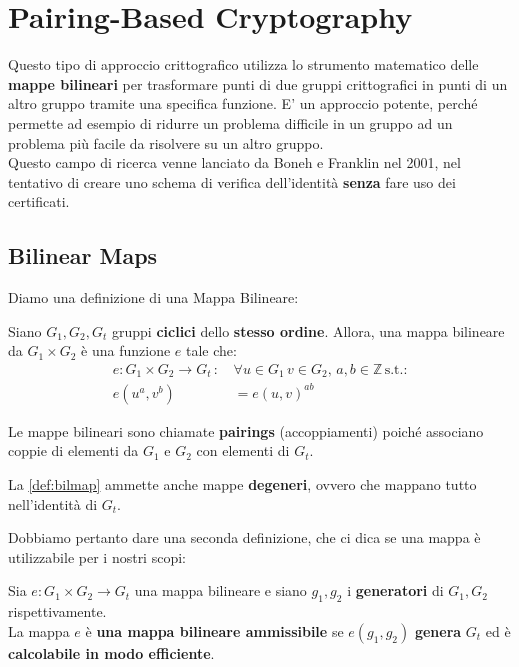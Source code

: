 \chapter{Pairing-Based Cryptography}
Questo tipo di approccio crittografico utilizza lo strumento matematico delle \textbf{mappe bilineari} per trasformare punti di due gruppi crittografici in punti di un altro gruppo tramite una specifica funzione. E' un approccio potente, perché permette ad esempio di ridurre un problema difficile in un gruppo ad un problema più facile da risolvere su un altro gruppo.\\
Questo campo di ricerca venne lanciato da Boneh e Franklin nel 2001, nel tentativo di creare uno schema di verifica dell'identità \textbf{senza} fare uso dei certificati.
\section{Bilinear Maps}
Diamo una definizione di una Mappa Bilineare:
\begin{definition}\label{def:bilmap}
Siano $G_1,G_2,G_t$ gruppi \textbf{ciclici} dello \textbf{stesso ordine}. Allora, una mappa bilineare da $G_1\times G_2$ è una funzione $e$ tale che:
\begin{equation}
    \begin{aligned}
    e:G_1\times G_2\longrightarrow G_t\,:\, &\forall u\in{G_1}\, v\in{G_2},\,a,b\in{\mathbb{Z}}\,\text{s.t.:}\\
    e(u^a,v^b)&=e(u,v)^{ab}
    \end{aligned}
\end{equation}
\end{definition}
\begin{remark}
Le mappe bilineari sono chiamate \textbf{pairings} (accoppiamenti) poiché associano coppie di elementi da $G_1$ e $G_2$ con elementi di $G_t$.
\end{remark}
\begin{note}La \cref{def:bilmap} ammette anche mappe \textbf{degeneri}, ovvero che mappano tutto nell'identità di $G_t$.
\end{note}
Dobbiamo pertanto dare una seconda definizione, che ci dica se una mappa è utilizzabile per i nostri scopi:
\begin{definition}\label{def:admbil}
Sia $e:G_1\times G_2\longrightarrow G_t$ una mappa bilineare e siano $g_1,g_2$ i \textbf{generatori} di $G_1,G_2$ rispettivamente.\\
La mappa $e$ è \textbf{una mappa bilineare ammissibile} se $e(g_1,g_2)$ \textbf{genera} $G_t$ ed è \textbf{calcolabile in modo efficiente}.
\end{definition}
